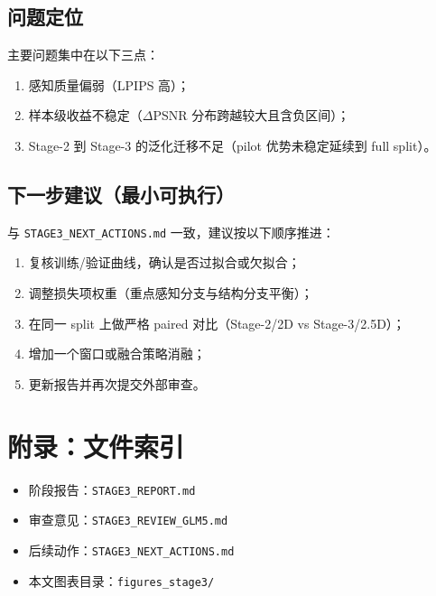 \documentclass[11pt,a4paper]{article}
\begin{document}
\subsection{问题定位}
主要问题集中在以下三点：
\begin{enumerate}[leftmargin=2em]
    \item 感知质量偏弱（LPIPS 高）；
    \item 样本级收益不稳定（$\Delta$PSNR 分布跨越较大且含负区间）；
    \item Stage-2 到 Stage-3 的泛化迁移不足（pilot 优势未稳定延续到 full split）。
\end{enumerate}

\subsection{下一步建议（最小可执行）}
与 \texttt{STAGE3\_NEXT\_ACTIONS.md} 一致，建议按以下顺序推进：
\begin{enumerate}[leftmargin=2em]
    \item 复核训练/验证曲线，确认是否过拟合或欠拟合；
    \item 调整损失项权重（重点感知分支与结构分支平衡）；
    \item 在同一 split 上做严格 paired 对比（Stage-2/2D vs Stage-3/2.5D）；
    \item 增加一个窗口或融合策略消融；
    \item 更新报告并再次提交外部审查。
\end{enumerate}

\section*{附录：文件索引}
\begin{itemize}[leftmargin=2em]
    \item 阶段报告：\texttt{STAGE3\_REPORT.md}
    \item 审查意见：\texttt{STAGE3\_REVIEW\_GLM5.md}
    \item 后续动作：\texttt{STAGE3\_NEXT\_ACTIONS.md}
    \item 本文图表目录：\texttt{figures\_stage3/}
\end{itemize}
\end{document}
